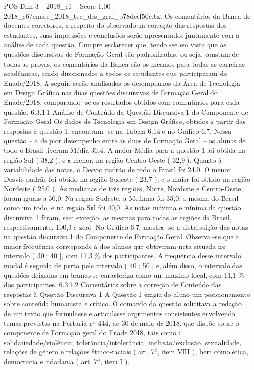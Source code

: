 \begin{textsample}{POS Dim 3 – 2018\_c6 – Score 1.00 – 2018\_c6/enade\_2018\_tec\_des\_graf\_b78dccf50c.txt}
Os comentários da Banca de docentes corretores, a respeito do observado na correção das respostas dos estudantes, suas impressões e conclusões serão apresentados juntamente com a análise de cada questão.
Cumpre esclarecer que, tendo -se em vista que as questões discursivas de Formação Geral são padronizadas, ou seja, constam de todas as provas, os comentários da Banca são os mesmos para todas as carreiras acadêmicas, sendo direcionados a todos os estudantes que participaram do Enade/2018.
A seguir, serão analisados os desempenhos da Área de Tecnologia em Design Gráfico nas duas questões discursivas de Formação Geral do Enade/2018, comparando -se os resultados obtidos com comentários para cada questão. 6.3.1.1 Análise de Conteúdo da Questão Discursiva 1 do Componente de Formação Geral Os dados de Tecnologia em Design Gráfico, obtidos a partir das respostas à questão 1, encontram -se na Tabela 6.14 e no Gráfico 6.7.
Nessa questão – a de pior desempenho entre as duas de Formação Geral – os alunos de todo o Brasil tiveram Média 36,4.
A maior Média para a questão 1 foi obtida na região Sul ( 38,2 ), e a menor, na região Centro-Oeste ( 32,9 ).
Quanto à variabilidade das notas, o Desvio padrão de todo o Brasil foi 24,0.
O menor Desvio padrão foi obtido na região Sudeste ( 23,7 ), e o maior foi obtido na região Nordeste ( 25,0 ).
As medianas de três regiões, Norte, Nordeste e Centro-Oeste, foram iguais a 30,0.
Na região Sudeste, a Mediana foi 35,0, a mesma do Brasil como um todo, e na região Sul foi 40,0.
As notas máxima e mínima da questão discursiva 1 foram, sem exceção, as mesmas para todas as regiões do Brasil, respectivamente, 100,0 e zero.
No Gráfico 6.7, mostra -se a distribuição das notas na questão discursiva 1 do Componente de Formação Geral.
Observa -se que a maior frequência corresponde à dos alunos que obtiveram nota situada no intervalo ( 30 ; 40 ], com 17,3 \% dos participantes.
A frequência desse intervalo modal é seguida de perto pelo intervalo ( 40 ; 50 ] e, além disso, o intervalo das questões deixadas em branco se caracteriza como um máximo local, com 11,1 \% dos participantes. 6.3.1.2 Comentários sobre a correção de Conteúdo das respostas à Questão Discursiva 1 A Questão 1 exigia do aluno um posicionamento sobre conteúdo humanista e crítico.
O comando da questão solicitava a redação de um texto que formulasse e articulasse argumentos consistentes envolvendo temas previstos na Portaria nº 444, de 30 de maio de 2018, que dispõe sobre o componente de Formação geral do Enade 2018, tais como : solidariedade/violência, tolerância/intolerância, inclusão/exclusão, sexualidade, relações de gênero e relações étnico-raciais ( art. 7º, item VIII ), bem como ética, democracia e cidadania ( art. 7º, item I ).

\end{textsample}
